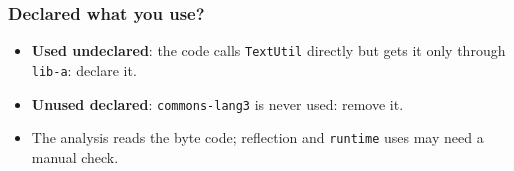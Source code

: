\documentclass[aspectratio=169,10pt,compress]{beamer}
\begin{document}
\begin{frame}[t,fragile] \frametitle{Declared what you use?}

  \vspace{0.1em}
  \small
  \begin{itemize}
    \item \textbf{Used undeclared}: the code calls \texttt{TextUtil} directly but gets it only through \texttt{lib-a}: declare it.
    \item \textbf{Unused declared}: \texttt{commons-lang3} is never used: remove it.
    \item The analysis reads the byte code; reflection and \texttt{runtime} uses may need a manual check.
  \end{itemize}
\end{frame}

\end{document}
